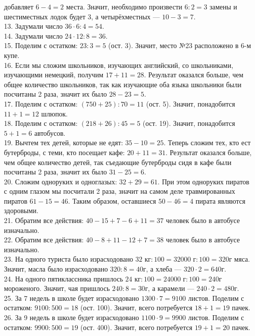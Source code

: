 добавляет $6-4=2$ места. Значит, необходимо произвести $6:2=3$ замены и шестиместных лодок будет 3, а четырёхместных --- $10-3=7.$\\
13. Задумали число $36\cdot6:4=54.$\\
14. Задумали число $24\cdot12:8=36.$\\
15. Поделим с остатком: $23:3=5$ (ост. 3). Значит, место №23 расположено в 6-м купе.\\
16. Если мы сложим школьников, изучающих английский, со школьниками, изучающими немецкий, получим $17+11=28.$ Результат оказался больше, чем общее количество школьников, так как изучающие оба языка школьники были посчитаны 2 раза, значит их было $28-23=5.$\\
17. Поделим с остатком: $(750+25):70=11$ (ост. 5). Значит, понадобится $11+1=12$ шлюпок.\\
18. Поделим с остатком: $(218+26):45=5$ (ост. 19). Значит, понадобится $5+1=6$ автобусов.\\
19. Вычтем тех детей, которые не едят: $35-10=25.$ Теперь сложим тех, кто ест бутерброды, с теми, кто посещает кафе: $20+11=31.$ Результат оказался больше, чем общее количество детей, так съедающие бутерброды сидя в кафе были посчитаны 2 раза, значит их было $31-25=6.$\\
20. Сложим одноруких и одноглазых: $32+29=61.$ При этом одноруких пиратов с одним глазом мы посчитали 2 раза, значит на самом деле травмированных пиратов $61-15=46.$ Таким образом, оставшиеся $50-46=4$ пирата являются здоровыми.\\
21. Обратим все действия: $40-15+7-6+11=37$ человек было в автобусе изначально.\\
22. Обратим все действия: $40-8+11-12+7=38$ человек было в автобусе изначально.\\
23. На одного туриста было израсходовано $32\text{ кг}:100=32000\text{ г}:100=320$г мяса. Значит, масла было израсходовано $320:8=40$г, а хлеба --- $320\cdot2=640$г.\\
24. На одного пятиклассника пришлось $24\text{ кг}:100=24000\text{ г}:100=240$г мороженого. Значит, чая пришлось $240:8=30$г, а карамели --- $240\cdot2=480$г.\\
25. За 7 недель в школе будет израсходовано $1300\cdot7=9100$ листов. Поделим с остатком: $9100:500=18$ (ост. 100). Значит, всего потребуется $18+1=19$ пачек.\\
26. За 9 недель в школе будет израсходовано $1100\cdot9=9900$ листов. Поделим с остатком: $9900:500=19$ (ост. 400). Значит, всего потребуется $19+1=20$ пачек.\\
